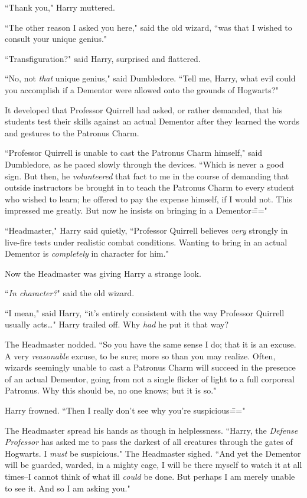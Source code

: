 ``Thank you," Harry muttered.

``The other reason I asked you here," said the old wizard, ``was that I wished to consult your unique genius."

``Transfiguration?" said Harry, surprised and flattered.

``No, not \emph{that} unique genius," said Dumbledore. ``Tell me, Harry, what evil could you accomplish if a Dementor were allowed onto the grounds of Hogwarts?"

\later

It developed that Professor Quirrell had asked, or rather demanded, that his students test their skills against an actual Dementor after they learned the words and gestures to the Patronus Charm.

``Professor Quirrell is unable to cast the Patronus Charm himself," said Dumbledore, as he paced slowly through the devices. ``Which is never a good sign. But then, he \emph{volunteered} that fact to me in the course of demanding that outside instructors be brought in to teach the Patronus Charm to every student who wished to learn; he offered to pay the expense himself, if I would not. This impressed me greatly. But now he insists on bringing in a Dementor\==="

``Headmaster," Harry said quietly, ``Professor Quirrell believes \emph{very} strongly in live-fire tests under realistic combat conditions. Wanting to bring in an actual Dementor is \emph{completely} in character for him."

Now the Headmaster was giving Harry a strange look.

``\emph{In character?}" said the old wizard.

``I mean," said Harry, ``it's entirely consistent with the way Professor Quirrell usually acts{\ldots}" Harry trailed off. Why \emph{had} he put it that way?

The Headmaster nodded. ``So you have the same sense I do; that it is an excuse. A very \emph{reasonable} excuse, to be sure; more so than you may realize. Often, wizards seemingly unable to cast a Patronus Charm will succeed in the presence of an actual Dementor, going from not a single flicker of light to a full corporeal Patronus. Why this should be, no one knows; but it is so."

Harry frowned. ``Then I really don't see why you're suspicious\==="

The Headmaster spread his hands as though in helplessness. ``Harry, the \emph{Defense Professor} has asked me to pass the darkest of all creatures through the gates of Hogwarts. I \emph{must} be suspicious." The Headmaster sighed. ``And yet the Dementor will be guarded, warded, in a mighty cage, I will be there myself to watch it at all times\---I cannot think of what ill \emph{could} be done. But perhaps I am merely unable to see it. And so I am asking you."

